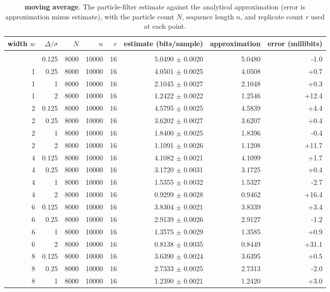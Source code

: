 {\small
\begin{longtable}[]{@{}rrrrrrrr@{}}
\toprule\noalign{}
width $w$ & $\Delta/\sigma$ & $N$ & $n$ & $r$ & estimate (bits/sample) & approximation & error (millibits) \\
\midrule\noalign{}
\endhead
\bottomrule\noalign{}
\caption{\textbf{moving average}. The particle-filter estimate against the analytical approximation (error is approximation minus estimate), with the particle count $N$, sequence length $n$, and replicate count $r$ used at each point.}\label{tab:family1}\\
\endlastfoot
1 & 0.125 & 8000 & 10000 & 16 & 5.0490 $\pm$ 0.0020 & 5.0480 & -1.0 \\
1 & 0.25 & 8000 & 10000 & 16 & 4.0501 $\pm$ 0.0025 & 4.0508 & +0.7 \\
1 & 1 & 8000 & 10000 & 16 & 2.1045 $\pm$ 0.0027 & 2.1048 & +0.3 \\
1 & 2 & 8000 & 10000 & 16 & 1.2422 $\pm$ 0.0022 & 1.2546 & +12.4 \\
2 & 0.125 & 8000 & 10000 & 16 & 4.5795 $\pm$ 0.0025 & 4.5839 & +4.4 \\
2 & 0.25 & 8000 & 10000 & 16 & 3.6202 $\pm$ 0.0027 & 3.6207 & +0.4 \\
2 & 1 & 8000 & 10000 & 16 & 1.8400 $\pm$ 0.0025 & 1.8396 & -0.4 \\
2 & 2 & 8000 & 10000 & 16 & 1.1091 $\pm$ 0.0026 & 1.1208 & +11.7 \\
4 & 0.125 & 8000 & 10000 & 16 & 4.1082 $\pm$ 0.0021 & 4.1099 & +1.7 \\
4 & 0.25 & 8000 & 10000 & 16 & 3.1720 $\pm$ 0.0031 & 3.1725 & +0.4 \\
4 & 1 & 8000 & 10000 & 16 & 1.5355 $\pm$ 0.0032 & 1.5327 & -2.7 \\
4 & 2 & 8000 & 10000 & 16 & 0.9299 $\pm$ 0.0028 & 0.9462 & +16.4 \\
6 & 0.125 & 8000 & 10000 & 16 & 3.8304 $\pm$ 0.0021 & 3.8339 & +3.4 \\
6 & 0.25 & 8000 & 10000 & 16 & 2.9139 $\pm$ 0.0026 & 2.9127 & -1.2 \\
6 & 1 & 8000 & 10000 & 16 & 1.3575 $\pm$ 0.0029 & 1.3585 & +0.9 \\
6 & 2 & 8000 & 10000 & 16 & 0.8138 $\pm$ 0.0035 & 0.8449 & +31.1 \\
8 & 0.125 & 8000 & 10000 & 16 & 3.6390 $\pm$ 0.0024 & 3.6395 & +0.5 \\
8 & 0.25 & 8000 & 10000 & 16 & 2.7333 $\pm$ 0.0025 & 2.7313 & -2.0 \\
8 & 1 & 8000 & 10000 & 16 & 1.2390 $\pm$ 0.0021 & 1.2420 & +3.0 \\

\end{longtable}}
